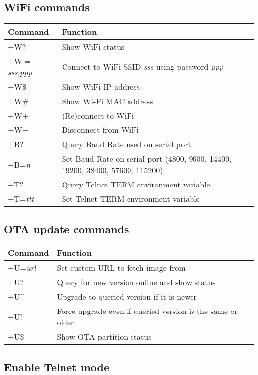 \subsection{WiFi commands}

\begin{tabular}{p{6em} | p{}}
\hline
\textbf{Command} & \textbf{Function} \\
\hline
$+$W?		& Show WiFi status \\
$+$W$=$\textit{sss},\textit{ppp}	& Connect to WiFi SSID \textit{sss} using password \textit{ppp} \\
$+$W\$		& Show WiFi IP address \\
$+$W\#		& Show Wi-Fi MAC address \\
$+$W$+$		& (Re)connect to WiFi \\
$+$W$-$		& Disconnect from WiFi \\
$+$B?		& Query Baud Rate used on serial port \\
$+$B=\textit{n}	& Set Baud Rate on serial port \newline
			(4800, 9600, 14400, 19200, 38400, 57600, 115200) \\
$+$T?		& Query Telnet TERM environment variable \\
$+$T=\textit{ttt}	& Set Telnet TERM environment variable \\
\hline
\end{tabular}

\subsection{OTA update commands}

\begin{tabular}{p{6em} | p{}}
\hline
\textbf{Command} 		& \textbf{Function} \\
\hline
$+$U=\textit{url}		& Set custom URL to fetch image from \\
$+$U?					& Query for new version online and show status \\
$+$U\textasciicircum 	& Upgrade to queried version if it is newer \\
$+$U!					& Force upgrade even if queried version is the same or older \\
$+$U\$					& Show OTA partition status \\
\hline
\end{tabular}

\subsection{Enable Telnet mode}

